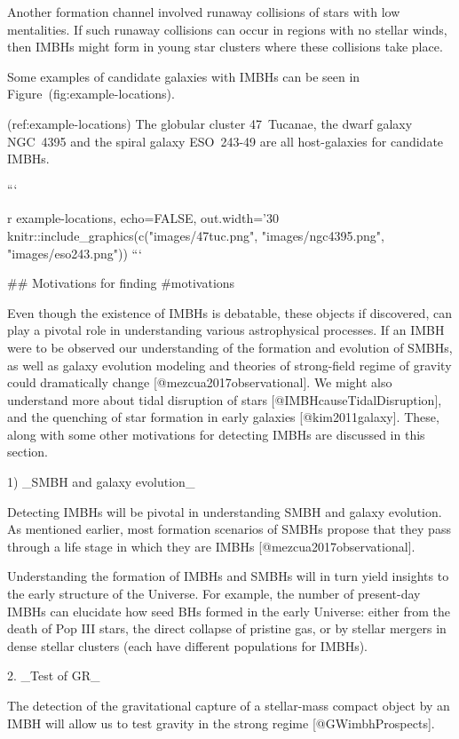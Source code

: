 {{{{{{{{{{{{{Another formation channel involved runaway collisions of stars with low
mentalities. If such runaway collisions can occur in regions with no
stellar winds, then IMBHs might form in young star clusters where these
collisions take place.

Some examples of candidate galaxies with IMBHs can be seen in
Figure~\@ref(fig:example-locations).

(ref:example-locations) The globular cluster 47~Tucanae, the dwarf galaxy NGC~4395 and the spiral galaxy ESO~243-49 are all host-galaxies for candidate IMBHs.

```{r example-locations, echo=FALSE, out.width='30%
knitr::include_graphics(c("images/47tuc.png", "images/ngc4395.png", "images/eso243.png"))
```



## Motivations for finding  {#motivations}

Even though the existence of IMBHs is debatable, these objects if
discovered, can play a pivotal role in understanding various
astrophysical processes. If an IMBH were to be observed our
understanding of the formation and evolution of SMBHs, as well as galaxy
evolution modeling and theories of strong-field regime of gravity could
dramatically change [@mezcua2017observational]. We might also understand
more about tidal disruption of stars [@IMBHcauseTidalDisruption], and
the quenching of star formation in early galaxies [@kim2011galaxy].
These, along with some other motivations for detecting IMBHs are
discussed in this section.


1) _SMBH and galaxy evolution_

    Detecting IMBHs will be pivotal in understanding SMBH and galaxy
    evolution. As mentioned earlier, most formation scenarios of SMBHs
    propose that they pass through a life stage in which they are IMBHs
    [@mezcua2017observational].

    Understanding the formation of IMBHs and SMBHs will in turn yield
    insights to the early structure of the Universe. For example, the
    number of present-day IMBHs can elucidate how seed BHs formed in the
    early Universe: either from the death of Pop III stars, the direct
    collapse of pristine gas, or by stellar mergers in dense stellar
    clusters (each have different populations for IMBHs).


2. _Test of GR_

    The detection of the gravitational capture of a stellar-mass compact
    object by an IMBH will allow us to test gravity in the strong regime
    [@GWimbhProspects].



}}}}}}}}}}}}}}
